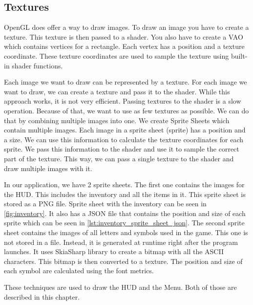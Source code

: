 \subsection{Textures} \label{sec:textures}
OpenGL does offer a way to draw images.
To draw an image you have to create a texture.
This texture is then passed to a shader.
You also have to create a VAO which contains vertices for a rectangle.
Each vertex has a position and a texture coordinate.
These texture coordinates are used to sample the texture using built-in shader functions.

Each image we want to draw can be represented by a texture.
For each image we want to draw, we can create a texture and pass it to the shader.
While this approach works, it is not very efficient.
Passing textures to the shader is a slow operation.
Because of that, we want to use as few textures as possible.
We can do that by combining multiple images into one.
We create Sprite Sheets which contain multiple images.
Each image in a sprite sheet (sprite) has a position and a size.
We can use this information to calculate the texture coordinates for each sprite.
We pass this information to the shader and use it to sample the correct part of the texture.
This way, we can pass a single texture to the shader and draw multiple images with it.

In our application, we have 2 sprite sheets.
The first one contains the images for the HUD.
This includes the inventory and all the items in it.
This sprite sheet is stored as a PNG file.
Sprite sheet with the inventory can be seen in \autoref{fig:inventory}.
It also has a JSON file that contains the position and size of each sprite which can be seen in \autoref{lst:inventory_sprite_sheet_json}.
The second sprite sheet contains the images of all letters and symbols used in the game.
This one is not stored in a file.
Instead, it is generated at runtime right after the program launches.
It uses SkiaSharp library to create a bitmap with all the ASCII characters.
This bitmap is then converted to a texture.
The position and size of each symbol are calculated using the font metrics.

These techniques are used to draw the HUD and the Menu.
Both of those are described in this chapter.

